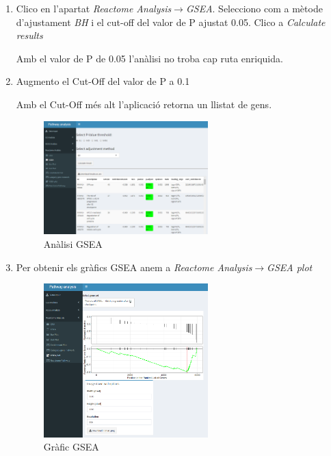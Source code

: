 \begin{enumerate}

\item Clico en l'apartat \textit{Reactome Analysis}$\rightarrow$\textit{\gls{GSEA}}. Selecciono com a mètode d'ajustament \textit{BH} i el cut-off del valor de P ajustat 0.05. Clico a \textit{Calculate results}

Amb el valor de P de 0.05 l'anàlisi no troba cap ruta enriquida.

\item Augmento el Cut-Off del valor de P a 0.1

Amb el Cut-Off més alt l'aplicació retorna un llistat de gens.

\begin{figure}[H]
\centering
\includegraphics[width=0.6\textwidth]{figures/Estudi1_Fig9_GSEA_RA.png} 
\caption{Anàlisi GSEA}
\end{figure}

\item Per obtenir els gràfics \gls{GSEA} anem a \textit{Reactome Analysis}$\rightarrow$\textit{GSEA plot}

\begin{figure}[H]
\centering
\includegraphics[width=0.6\textwidth]{figures/Estudi1_Fig10_GSEA_RA.png} 
\caption{Gràfic \gls{GSEA}}
\end{figure}
\end{enumerate}

